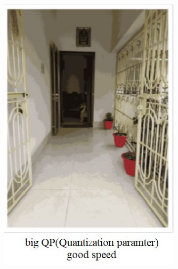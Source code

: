 \documentclass[a4paper]{article}
\begin{document}
\begin{figure}[H]
	\centering
	\begin{subfigure}{.3\textwidth}
		\centering
		\includegraphics[width=.9\linewidth]{q1_3}
	\end{subfigure}%
	\begin{subfigure}{.3\textwidth}
		\centering

\end{subfigure}
\end{figure}
\end{document}
